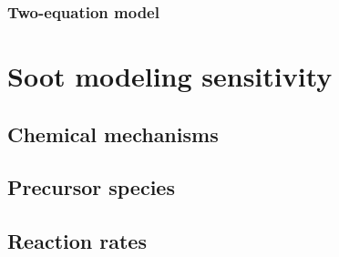 \subsubsection{Two-equation model} 
  
  
  
\section{Soot modeling sensitivity}

\subsection{Chemical mechanisms}


\subsection{Precursor species}



\subsection{Reaction rates}

